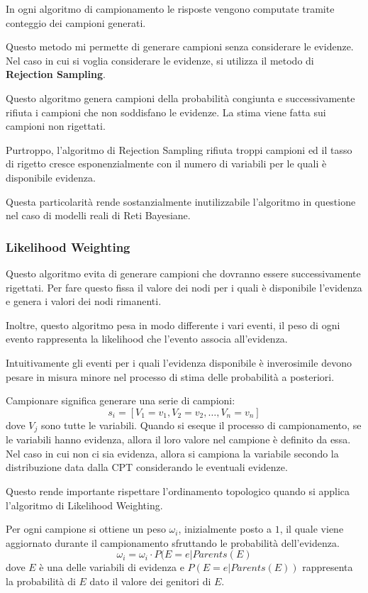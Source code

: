 In ogni algoritmo di campionamento le risposte vengono computate tramite conteggio
dei campioni generati.

Questo metodo mi permette di generare campioni senza considerare le evidenze. Nel
caso in cui si voglia considerare le evidenze, si utilizza il metodo di \textbf{Rejection
    Sampling}.

Questo algoritmo genera campioni della probabilità congiunta e successivamente
rifiuta i campioni che non soddisfano le evidenze. La stima viene fatta sui
campioni non rigettati.

Purtroppo, l'algoritmo di Rejection Sampling rifiuta troppi campioni ed il tasso
di rigetto cresce esponenzialmente con il numero di variabili per le quali è
disponibile evidenza.

Questa particolarità rende sostanzialmente inutilizzabile l'algoritmo in questione
nel caso di modelli reali di Reti Bayesiane.
\subsubsection{Likelihood Weighting}
Questo algoritmo evita di generare campioni che dovranno essere successivamente
rigettati. Per fare questo fissa il valore dei nodi per i quali è disponibile
l'evidenza e genera i valori dei nodi rimanenti.

Inoltre, questo algoritmo pesa in modo differente i vari eventi, il peso di ogni
evento rappresenta la likelihood che l'evento associa all'evidenza.

Intuitivamente gli eventi per i quali l'evidenza disponibile è inverosimile devono
pesare in misura minore nel processo di stima delle probabilità a posteriori.

Campionare significa generare una serie di campioni:
\begin{equation*}
    s_i = \left[V_1=v_1, V_2= v_2, \dots, V_n=v_n\right]
\end{equation*}
dove $V_j$ sono tutte le variabili. Quando si eseque il processo di campionamento, 
se le variabili hanno evidenza, allora il loro valore nel campione è definito da essa.
Nel caso in cui non ci sia evidenza, allora si campiona la variabile secondo la
distribuzione data dalla CPT considerando le eventuali evidenze.

Questo rende importante rispettare l'ordinamento topologico quando si applica 
l'algoritmo di Likelihood Weighting.

Per ogni campione si ottiene un peso $\omega_i$, inizialmente posto a $1$, il 
quale viene aggiornato durante il campionamento sfruttando le probabilità dell'evidenza.
\begin{equation*}
    \omega_i = \omega_i \cdot P(E = e | Parents(E)
\end{equation*}
dove $E$ è una delle variabili di evidenza e $P(E=e | Parents(E))$ rappresenta la
probabilità di $E$ dato il valore dei genitori di $E$.

